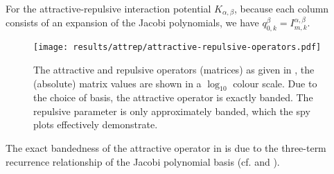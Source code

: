 For the attractive-repulsive interaction potential $K_{\alpha,\beta}$, because each column consists of an expansion of the Jacobi polynomials, we have $q^{\beta}_{0,k} = I_{m,k}^{\alpha,\beta}$.

\begin{figure}[H]
  \centering
  \texttt{[image: results/attrep/attractive-repulsive-operators.pdf]}
  \caption[Attractive and repulsive operators.]{The attractive and repulsive operators (matrices) as given in , the (absolute) matrix values are shown in a $\log_{10}$ colour scale. Due to the choice of basis, the attractive operator is exactly banded. The repulsive parameter is only approximately banded, which the spy plots effectively demonstrate.}
  \label{fig:attractive-repulsive}
\end{figure}

The exact bandedness of the attractive operator in  is due to the three-term recurrence relationship of the Jacobi polynomial basis (cf.  and ).
